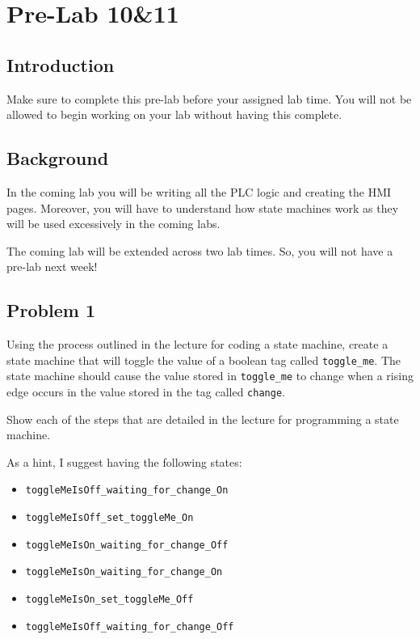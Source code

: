 \chapter{Pre-Lab 10\&11}
\setcounter{TASignatures}{0}
\setcounter{AsideCounter}{0}

\section{Introduction}

Make sure to complete this pre-lab before your assigned lab time. You will not be allowed to begin working on your lab without having this complete.

\section{Background}


In the coming lab you will be writing all the PLC logic and creating the HMI pages. Moreover, you will have to understand how state machines work as they will be used excessively in the coming labs.

The coming lab will be extended across two lab times. So, you will not have a pre-lab next week!

\section{Problem 1}

Using the process outlined in the lecture for coding a state machine, create a state machine that will toggle the value of a boolean tag called \verb|toggle_me|. The state machine should cause the value stored in \verb|toggle_me| to change when a rising edge occurs in the value stored in the tag called \verb|change|. 

Show each of the steps that are detailed in the lecture for programming a state machine.

As a hint, I suggest having the following states:
\begin{itemize}
    \item[] \verb|toggleMeIsOff_waiting_for_change_On|
    \item[] \verb|toggleMeIsOff_set_toggleMe_On|
    \item[] \verb|toggleMeIsOn_waiting_for_change_Off|
    \item[] \verb|toggleMeIsOn_waiting_for_change_On|
    \item[] \verb|toggleMeIsOn_set_toggleMe_Off|
    \item[] \verb|toggleMeIsOff_waiting_for_change_Off|
\end{itemize}

